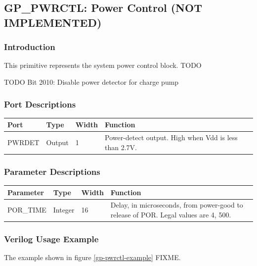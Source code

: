 \documentclass{article}
\begin{document}

\pagebreak
\clearpage
\subsection{GP\_PWRCTL: Power Control (NOT IMPLEMENTED)}

\subsubsection{Introduction}
This primitive represents the system power control block. TODO


TODO
Bit 2010: Disable power detector for charge pump

\subsubsection{Port Descriptions}

\begin{tabularx}{5in}{|l|l|l|X|}
\hline
{\bfseries Port} & {\bfseries Type} & {\bfseries Width} & {\bfseries Function} \\
\hline
PWRDET & Output & 1 & Power-detect output. High when Vdd is less than 2.7V.\\
\hline
\end{tabularx}

\subsubsection{Parameter Descriptions}

\begin{tabularx}{5in}{|l|l|l|X|}
\hline
{\bfseries Parameter} & {\bfseries Type} & {\bfseries Width} & {\bfseries Function} \\
\hline
POR\_TIME & Integer & 16 & Delay, in microseconds, from power-good to release of POR. Legal values are 4, 500.\\
\hline
\end{tabularx}

\subsubsection{Verilog Usage Example}

The example shown in figure \ref{gp-pwrctl-example} FIXME.
\end{document}
